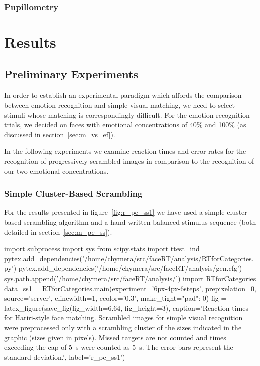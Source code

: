 	\subsection{Pupillometry}\label{sec:m_om_pm}
\chapter{Results}
    \section{Preliminary Experiments}\label{sec:r_pe}
	In order to establish an experimental paradigm which affords the comparison between emotion recognition and simple visual matching, we need to select stimuli whose matching is correspondingly difficult.
	For the emotion recognition trials, we decided on faces with emotional concentrations of 40\% and 100\% (as discussed in section~\ref{sec:m_vs_ef}).
	
	In the following experiments we examine reaction times and error rates for the recognition of progressively scrambled images in comparison to the recognition of our two emotional concentrations.
	\subsection{Simple Cluster-Based Scrambling}\label{sec:r_pe_ss}
	    For the results presented in figure~\ref{fig:r_pe_ss1} we have used a simple cluster-based scrambling algorithm and a hand-written balanced stimulus sequence 
	    (both detailed in section~\ref{sec:m_pe_ss}).
	    \begin{pycode}
		import subprocess
		import sys
		from scipy.stats import ttest_ind
		pytex.add_dependencies('/home/chymera/src/faceRT/analysis/RTforCategories.py')
		pytex.add_dependencies('/home/chymera/src/faceRT/analysis/gen.cfg')
		sys.path.append('/home/chymera/src/faceRT/analysis/')
		import RTforCategories
		data_ss1 = RTforCategories.main(experiment='6px-4px-6steps', prepixelation=0, source='server', elinewidth=1, ecolor='0.3', make_tight={"pad": 0})
		fig = latex_figure(save_fig(fig_width=6.64, fig_height=3), caption='Reaction times for Hariri-style face matching. Scrambled images for simple visual recognition were preprocessed only with a scrambling cluster of the sizes indicated in the graphic (sizes given in pixels). Missed targets are not counted and times exceeding the cap of \SI{5}{\second} were counted as \SI{5}{\second}. The error bars represent the standard deviation.', label='r_pe_ss1')
	    \end{pycode}
	    
